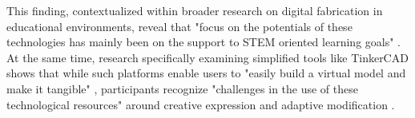 This finding, contextualized within broader research on digital fabrication in educational environments, reveal that "focus on the potentials of these technologies has mainly been on the support to STEM oriented learning goals" \citep{smith2016}. At the same time, research specifically examining simplified tools like TinkerCAD shows that while such platforms enable users to "easily build a virtual model and make it tangible" \citep{barbosa2024}, participants recognize "challenges in the use of these technological resources" around creative expression and adaptive modification \citep{barbosa2024}.


\vspace{0.5cm}
\vspace{0.5cm}
\vspace{0.5cm}
\vspace{0.5cm}
\vspace{0.5cm}
\vspace{0.5cm}
\vspace{0.5cm}
\vspace{0.5cm}
\vspace{0.5cm}
\vspace{0.5cm}
\vspace{0.5cm}
\vspace{0.5cm}
\vspace{0.5cm}
\vspace{0.5cm}
\vspace{0.5cm}


